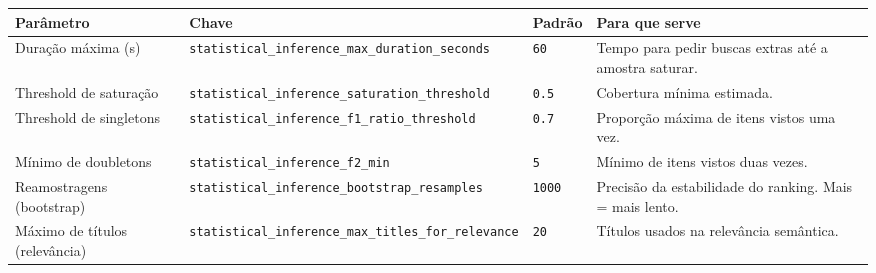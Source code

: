\documentclass[
  brazilian,
  a4paper,12pt,oneside]{report}
\newcounter{none} %
\begin{document}
{\def\LTcaptype{none} %
\begin{longtable}[]{@{}
  >{\raggedright\arraybackslash}p{}
  >{\raggedright\arraybackslash}p{}
  >{\raggedright\arraybackslash}p{}
  >{\raggedright\arraybackslash}p{}@{}}
\toprule\noalign{}
\begin{minipage}[b]{\linewidth}\raggedright
Parâmetro
\end{minipage} & \begin{minipage}[b]{\linewidth}\raggedright
Chave
\end{minipage} & \begin{minipage}[b]{\linewidth}\raggedright
Padrão
\end{minipage} & \begin{minipage}[b]{\linewidth}\raggedright
Para que serve
\end{minipage} \\
\midrule\noalign{}
\endhead
\bottomrule\noalign{}
\endlastfoot
Duração máxima (s) &
\texttt{statistical\_}\allowbreak{}\texttt{inference\_}\allowbreak{}\texttt{max\_}\allowbreak{}\texttt{duration\_}\allowbreak{}\texttt{seconds}
& \texttt{60} & Tempo para pedir buscas extras até a amostra saturar. \\
Threshold de saturação &
\texttt{statistical\_}\allowbreak{}\texttt{inference\_}\allowbreak{}\texttt{saturation\_}\allowbreak{}\texttt{threshold}
& \texttt{0.}\allowbreak{}\texttt{5} & Cobertura mínima estimada. \\
Threshold de singletons &
\texttt{statistical\_}\allowbreak{}\texttt{inference\_}\allowbreak{}\texttt{f1\_}\allowbreak{}\texttt{ratio\_}\allowbreak{}\texttt{threshold}
& \texttt{0.}\allowbreak{}\texttt{7} & Proporção máxima de itens vistos
uma vez. \\
Mínimo de doubletons &
\texttt{statistical\_}\allowbreak{}\texttt{inference\_}\allowbreak{}\texttt{f2\_}\allowbreak{}\texttt{min}
& \texttt{5} & Mínimo de itens vistos duas vezes. \\
Reamostragens (bootstrap) &
\texttt{statistical\_}\allowbreak{}\texttt{inference\_}\allowbreak{}\texttt{bootstrap\_}\allowbreak{}\texttt{resamples}
& \texttt{1000} & Precisão da estabilidade do ranking. Mais = mais
lento. \\
Máximo de títulos (relevância) &
\texttt{statistical\_}\allowbreak{}\texttt{inference\_}\allowbreak{}\texttt{max\_}\allowbreak{}\texttt{titles\_}\allowbreak{}\texttt{for\_}\allowbreak{}\texttt{relevance}
& \texttt{20} & Títulos usados na relevância semântica. \\
\end{longtable}
}
\end{document}
